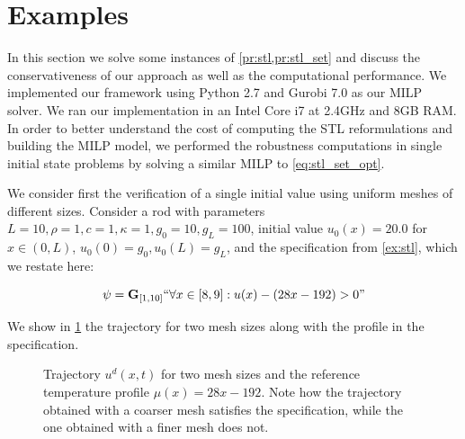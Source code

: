 \documentclass[oribibl]{llncs/llncs}
\newcommand{\Always}{\mathbf{G}}
\begin{document}
\section{Examples}
\label{sec:examples}

In this section we solve some instances of \cref{pr:stl,pr:stl_set} and discuss
the conservativeness of our approach as well as the computational performance.
We implemented our framework using Python 2.7 and Gurobi 7.0 as our MILP solver.
We ran our implementation in an Intel Core i7 at 2.4GHz and 8GB RAM. In order to
better understand the cost of computing the STL reformulations and building the
MILP model, we performed the robustness computations in single initial state
problems by solving a similar MILP to \cref{eq:stl_set_opt}.

We consider first the verification of a single initial value using uniform
meshes of different sizes. Consider a rod with parameters $L = 10, \rho = 1, c =
1, \kappa = 1, g_0 = 10, g_L = 100$, initial value $u_0(x) = 20.0$
for $x \in (0, L)$, $u_0(0) = g_0, u_0(L) = g_L$, and the specification from
\cref{ex:stl}, which we restate here:

\begin{equation}
    \psi = \Always_{[1,10]} ``\forall x \in [8,9] : u(x) - (28x - 192) > 0"
\end{equation}

We show in \cref{fig:ex1_evolution} the trajectory for two mesh sizes along with the
profile in the specification.

\begin{figure}[!t]
    \centering 
        \hfill
        \hfill
    \caption{Trajectory $u^d(x, t)$ for two mesh sizes and the reference
        temperature profile $\mu(x) = 28x - 192$. Note how the trajectory
        obtained with a coarser mesh satisfies the specification, while the one
        obtained with a finer mesh does not.}
    \label{fig:ex1_evolution}
\end{figure}
\end{document}
